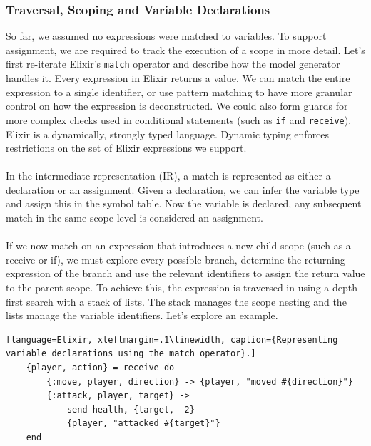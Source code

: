 \subsubsection{Traversal, Scoping and Variable Declarations}
So far, we assumed no expressions were matched to variables. To support assignment, we are required to track the execution of a scope in more detail. Let's first re-iterate Elixir's \texttt{match} operator and describe how the model generator handles it. Every expression in Elixir returns a value. We can match the entire expression to a single identifier, or use pattern matching to have more granular control on how the expression is deconstructed. We could also form guards for more complex checks used in conditional statements (such as \texttt{if} and \texttt{receive}). Elixir is a dynamically, strongly typed language. Dynamic typing enforces restrictions on the set of Elixir expressions we support.
\\ \\
In the intermediate representation (IR), a match is represented as either a declaration or an assignment. Given a declaration, we can infer the variable type and assign this in the symbol table. Now the variable is declared, any subsequent match in the same scope level is considered an assignment.
\\ \\
If we now match on an expression that introduces a new child scope (such as a receive or if), we must explore every possible branch, determine the returning expression of the branch and use the relevant identifiers to assign the return value to the parent scope. To achieve this, the expression is traversed in using a depth-first search with a stack of lists. The stack manages the scope nesting and the lists manage the variable identifiers. Let's explore an example.
\begin{lstlisting}[language=Elixir, xleftmargin=.1\linewidth, caption={Representing variable declarations using the match operator}.]
    {player, action} = receive do
        {:move, player, direction} -> {player, "moved #{direction}"}
        {:attack, player, target} -> 
            send health, {target, -2}
            {player, "attacked #{target}"}
    end
\end{lstlisting}
